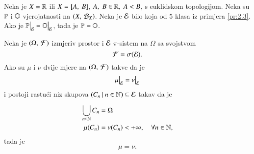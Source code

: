 \begin{kor} \label{kor:2.8}
    Neka je $X = \mathbb{R}$ ili $X = [{A}, \:{B}]$, $A, \; B \in \mathbb{R}, \; A < B$, s euklidskom topologijom.
    Neka su $\mathbb{P}$ i $\mathbb{O}$ vjerojatnosti na $({X}, \: {\mathcal{B}_{X}})$.
    Neka je $\mathcal{E}$ bilo koja od 5 klasa iz primjera \ref{pr:2.3}.
    Ako je $\restr{\masP}{\famE} = \restr{\masO}{\famE}$, tada je $\mathbb{P} = \mathbb{O}$.
\end{kor}

\begin{zad} \label{zad:2.9}
    Neka je $(\Omega, \: \mathcal{F})$ izmjeriv prostor i $\mathcal{E}$ $\pi$-sistem na $\Omega$ sa svojstvom
    \begin{equation*}
        \mathcal{F} = \sigma({\mathcal{E}}).
    \end{equation*}
    Ako su $\mu$ i $\nu$ dvije mjere na $(\Omega, \: \mathcal{F})$ takve da je
    \begin{equation*}
        \restr{\mu}{\famE} = \restr{\nu}{\famE}
    \end{equation*}
    i postoji rastu\' ci niz skupova $({C_n} \: | \: {n \in \mathbb{N}}) \subseteq \mathcal{E}$ takav da je
    \begin{equation*}
        \begin{aligned}
            \bigcup\limits_{n \in \mathbb{N}}^{}C_n &= \Omega\\
            \mu({C_n}) &= \nu(C_n) < +\infty, \quad \forall n \in \mathbb{N},
        \end{aligned}
    \end{equation*}
    tada je
    \begin{equation*}
        \mu = \nu.
    \end{equation*}
\end{zad}

